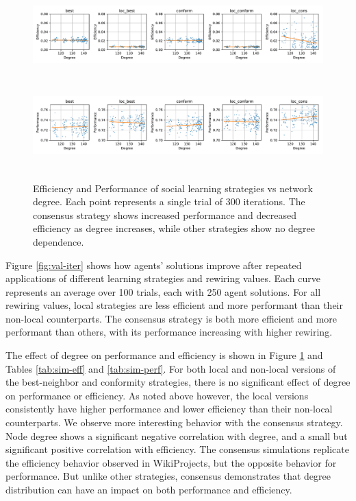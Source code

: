 \begin{figure}
\includegraphics[width=6.67in,height=1.33in]{fig-deg-eff.pdf}
\includegraphics[width=6.67in,height=1.33in]{fig-deg-perf.pdf}
\caption{
Efficiency and Performance of social learning strategies vs network degree.
Each point represents a single trial of 300 iterations.
The consensus strategy shows increased performance and decreased efficiency as
degree increases, while other strategies show no degree dependence.
\label{fig:deg-eff-perf}
}
\end{figure}

Figure \ref{fig:val-iter} shows how agents' solutions improve after repeated applications of
different learning strategies and rewiring values.
Each curve represents an average over 100 trials, each with 250 agent solutions.
For all rewiring values, local strategies are less efficient and more performant than their
non-local counterparts.
The consensus strategy is both more efficient and more performant than others,
with its performance increasing with higher rewiring.

The effect of degree on performance and efficiency is shown in Figure \ref{fig:deg-eff-perf} and
Tables \ref{tab:sim-eff} and \ref{tab:sim-perf}.
For both local and non-local versions of the best-neighbor and conformity strategies,
there is no significant effect of degree on performance or efficiency.
As noted above however, the local versions consistently have higher performance and lower efficiency
than their non-local counterparts.
We observe more interesting behavior with the consensus strategy.
Node degree shows a significant negative correlation with degree,
and a small but significant positive correlation with efficiency.
The consensus simulations replicate the efficiency behavior observed in WikiProjects,
but the opposite behavior for performance.
But unlike other strategies, consensus demonstrates that degree distribution can have an
impact on both performance and efficiency.


